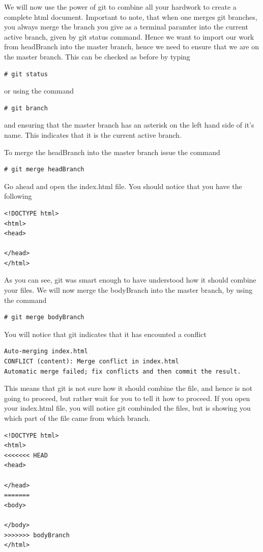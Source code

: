 \documentclass[a4paper,10pt]{article}
\begin{document}
We will now use the power of git to combine all your hardwork to create a complete html document. Important to note, that when one merges git branches, you always merge the branch you give as a terminal paramter into the current active branch, given by git status command. Hence we want to import our work from headBranch into the master branch, hence we need to ensure that we are on the master branch. This can be checked as before by typing 
\begin{lstlisting}[style=TerminalStyle]
# git status
\end{lstlisting}

or using the command

\begin{lstlisting}[style=TerminalStyle]
# git branch
\end{lstlisting}

and ensuring that the master branch has an asterisk on the left hand side of it's name. This indicates that it is the current active branch.

To merge the headBranch into the master branch issue the command
\begin{lstlisting}[style=TerminalStyle]
# git merge headBranch
\end{lstlisting}


Go ahead and open the index.html file. You should notice that you have the following
\begin{lstlisting}[style=HtmlStyle]
<!DOCTYPE html>
<html>
<head>

</head>
</html> 
\end{lstlisting}

As you can see, git was smart enough to have understood how it should combine your files. We will now merge the bodyBranch into the master branch, by using the command
\begin{lstlisting}[style=TerminalStyle]
# git merge bodyBranch
\end{lstlisting}

You will notice that git indicates that it has encounted a conflict
\begin{lstlisting}[style=OutputStyle]
Auto-merging index.html
CONFLICT (content): Merge conflict in index.html
Automatic merge failed; fix conflicts and then commit the result.
\end{lstlisting}

This means that git is not sure how it should combine the file, and hence is not going to proceed, but rather wait for you to tell it how to proceed. If you open your index.html file, you will notice git combinded the files, but is showing you which part of the file came from which branch. 
\begin{lstlisting}[style=HtmlStyle]
<!DOCTYPE html>
<html>
<<<<<<< HEAD
<head>

</head>
=======
<body>

</body>
>>>>>>> bodyBranch
</html>
\end{lstlisting}
\end{document}
